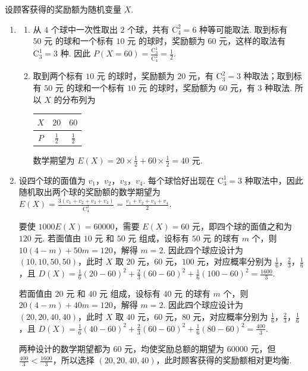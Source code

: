 \begin{solution}
设顾客获得的奖励额为随机变量 \(X\).

\begin{enumerate}
\item
\begin{enumerate}
\item 从 \(4\) 个球中一次性取出 \(2\) 个球，共有 \(\mathrm C_4^2=6\) 种等可能取法. 取到标有 \(50\text{ 元}\) 的球和一个标有 \(10\text{ 元}\) 的球时，奖励额为 \(60\text{ 元}\)，这样的取法有 \(\mathrm C_3^1=3\) 种. 因此
\(P(X=60)=\frac{\mathrm C_3^1}{\mathrm C_4^2}=\frac{1}{2}\).

\item 取到两个标有 \(10\text{ 元}\) 的球时，奖励额为 \(20\text{ 元}\)，有 \(\mathrm C_3^2=3\) 种取法；取到标有 \(50\text{ 元}\) 的球和一个标有 \(10\text{ 元}\) 的球时，奖励额为 \(60\text{ 元}\)，有 \(3\) 种取法. 所以 \(X\) 的分布列为
\begin{center}
\begin{tabular}{c|cc}
\(X\)&\(20\)&\(60\)\\
\hline
\(P\)&\(\frac{1}{2}\)&\(\frac{1}{2}\)
\end{tabular}
\end{center}
数学期望为 \(E(X)=20\times\frac{1}{2}+60\times\frac{1}{2}=40\text{ 元}\).
\end{enumerate}

\item 设四个球的面值为 \(v_1\)，\(v_2\)，\(v_3\)，\(v_4\). 每个球恰好出现在 \(\mathrm C_3^1=3\) 种取法中，因此随机取出两个球的奖励额的数学期望为
\(E(X)=\frac{3(v_1+v_2+v_3+v_4)}{\mathrm C_4^2}=\frac{v_1+v_2+v_3+v_4}{2}\).

要使 \(1000E(X)=60000\)，需要 \(E(X)=60\text{ 元}\)，即四个球的面值之和为 \(120\text{ 元}\). 若面值由 \(10\text{ 元}\) 和 \(50\text{ 元}\) 组成，设标有 \(50\text{ 元}\) 的球有 \(m\) 个，则
\(10(4-m)+50m=120\)，解得 \(m=2\). 因此四个球应设计为 \((10,10,50,50)\)，此时 \(X\) 取 \(20\text{ 元}\)，\(60\text{ 元}\)，\(100\text{ 元}\)，对应概率分别为 \(\frac{1}{6}\)，\(\frac{2}{3}\)，\(\frac{1}{6}\)，且
\(D(X)=\frac{1}{6}(20-60)^2+\frac{2}{3}(60-60)^2+\frac{1}{6}(100-60)^2=\frac{1600}{3}\).

若面值由 \(20\text{ 元}\) 和 \(40\text{ 元}\) 组成，设标有 \(40\text{ 元}\) 的球有 \(m\) 个，则
\(20(4-m)+40m=120\)，解得 \(m=2\). 因此四个球应设计为 \((20,20,40,40)\)，此时 \(X\) 取 \(40\text{ 元}\)，\(60\text{ 元}\)，\(80\text{ 元}\)，对应概率分别为 \(\frac{1}{6}\)，\(\frac{2}{3}\)，\(\frac{1}{6}\)，且
\(D(X)=\frac{1}{6}(40-60)^2+\frac{2}{3}(60-60)^2+\frac{1}{6}(80-60)^2=\frac{400}{3}\).

两种设计的数学期望都为 \(60\text{ 元}\)，均使奖励总额的期望为 \(60000\text{ 元}\)，但 \(\frac{400}{3}<\frac{1600}{3}\)，所以选择 \((20,20,40,40)\)，此时顾客获得的奖励额相对更均衡.
\end{enumerate}
\end{solution}

